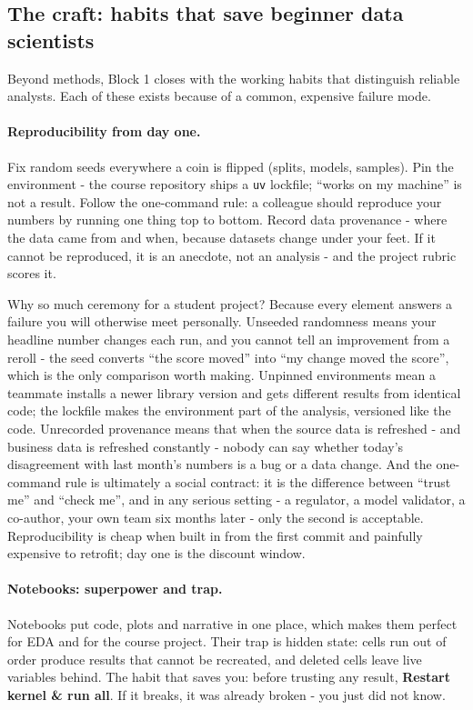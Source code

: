 \documentclass[11pt,a4paper]{article}
\begin{document}
\subsection{The craft: habits that save beginner data scientists}
Beyond methods, Block 1 closes with the working habits that distinguish
reliable analysts. Each of these exists because of a common, expensive
failure mode.

\paragraph{Reproducibility from day one.} Fix random seeds everywhere a coin
is flipped (splits, models, samples). Pin the environment - the course
repository ships a \texttt{uv} lockfile; ``works on my machine'' is not a
result. Follow the one-command rule: a colleague should reproduce your
numbers by running one thing top to bottom. Record data provenance -
where the data came from and when, because datasets change under your feet.
If it cannot be reproduced, it is an anecdote, not an analysis - and the
project rubric scores it.

Why so much ceremony for a student project? Because every element answers
a failure you will otherwise meet personally. Unseeded randomness means
your headline number changes each run, and you cannot tell an improvement
from a reroll - the seed converts ``the score moved'' into ``my change
moved the score'', which is the only comparison worth making. Unpinned
environments mean a teammate installs a newer library version and gets
different results from identical code; the lockfile makes the environment
part of the analysis, versioned like the code. Unrecorded provenance
means that when the source data is refreshed - and business data is
refreshed constantly - nobody can say whether today's disagreement with
last month's numbers is a bug or a data change. And the one-command rule
is ultimately a social contract: it is the difference between ``trust
me'' and ``check me'', and in any serious setting - a regulator, a model
validator, a co-author, your own team six months later - only the second
is acceptable. Reproducibility is cheap when built in from the first
commit and painfully expensive to retrofit; day one is the discount
window.

\paragraph{Notebooks: superpower and trap.} Notebooks put code, plots and
narrative in one place, which makes them perfect for EDA and for the course
project. Their trap is hidden state: cells run out of order produce results
that cannot be recreated, and deleted cells leave live variables behind. The
habit that saves you: before trusting any result, \textbf{Restart kernel \&
run all}. If it breaks, it was already broken - you just did not know.
\end{document}
